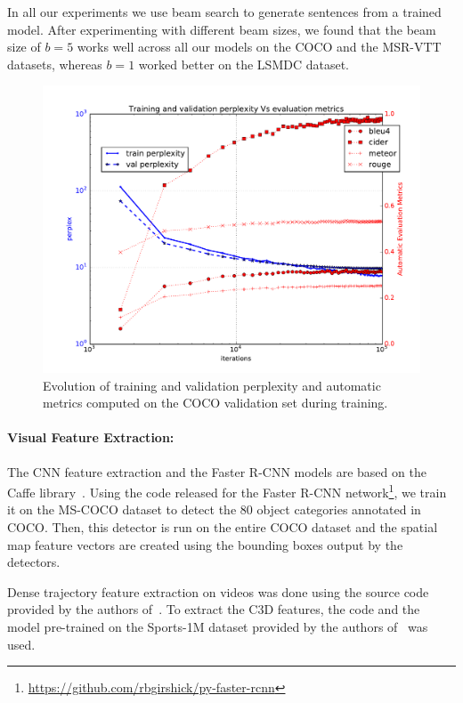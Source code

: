 In all our experiments we use beam search to generate sentences from a trained
model.
After experimenting with different beam sizes, we found that the beam size of
$b=5$ works well across all our models on the COCO and the MSR-VTT datasets,
whereas $b=1$ worked better on the LSMDC dataset.

\begin{figure}[ht]
\begin{center}
  \includegraphics[width=0.7\linewidth]{images/MetVsPerplex.pdf}
\end{center}
\vspace*{-10mm}
\caption{Evolution of training and validation perplexity and automatic metrics
        computed on the COCO validation set during training.}
\label{fig:MetVsPerplex}
\end{figure}
\paragraph*{Visual Feature Extraction:}%
The CNN feature extraction and the Faster R-CNN models are based on the Caffe
library~\cite{jia2014caffe}.
Using the code released for the Faster R-CNN
network\footnote{\url{https://github.com/rbgirshick/py-faster-rcnn}}, we train it on
the MS-COCO dataset to detect the 80 object categories annotated in COCO.
Then, this detector is run on the entire COCO dataset and the spatial map feature
vectors are created using the bounding boxes output by the detectors.

Dense trajectory feature extraction on videos was done using the source code
provided by the authors of~\cite{DBLP:conf/cvpr/WangKSL11}.
To extract the C3D features, the code and the model pre-trained on the
Sports-1M dataset provided by the authors of~\cite{DBLP:C3D} was used.


